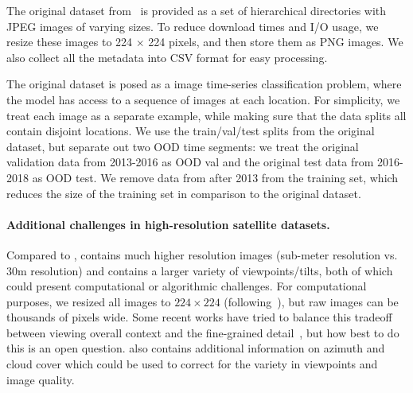 The original dataset from~\citet{christie2018fmow} is provided as a set of hierarchical directories with JPEG images of varying sizes.
To reduce download times and I/O usage, we resize these images to 224 $\times$ 224 pixels, and then store them as PNG images.
We also collect all the metadata into CSV format for easy processing.

The original dataset is posed as a image time-series classification problem, where the model has access to a sequence of images at each location. For simplicity, we treat each image as a separate example, while making sure that the data splits all contain disjoint locations. We use the train/val/test splits from the original dataset, but separate out two OOD time segments: we treat the original validation data from 2013-2016 as OOD val and the original test data from 2016-2018 as OOD test. We remove data from after 2013 from the training set, which reduces the size of the training set in comparison to the original dataset.


\paragraph{Additional challenges in high-resolution satellite datasets.}
Compared to \PovertyMap, \FMoW contains much higher resolution images (sub-meter resolution vs. 30m resolution) and contains a larger variety of viewpoints/tilts, both of which could present computational or algorithmic challenges. For computational purposes, we resized all images to $224\times 224$ (following~\citet{christie2018fmow}), but raw images can be thousands of pixels wide. Some recent works have tried to balance this tradeoff between viewing overall context and the fine-grained detail~\citep{uzkent2020zoom,kim2016multiresolution}, but how best to do this is an open question. \FMoW also contains additional information on azimuth and cloud cover which could be used to correct for the variety in viewpoints and image quality.
